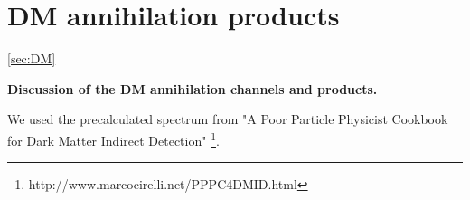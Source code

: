 \section{DM annihilation products}
\ref{sec:DM}

\textbf{Discussion of the DM annihilation channels and products.}

We used the precalculated spectrum from "A Poor Particle Physicist Cookbook for Dark Matter Indirect Detection" \cite{Cirelli_2011}\footnote{http://www.marcocirelli.net/PPPC4DMID.html}.